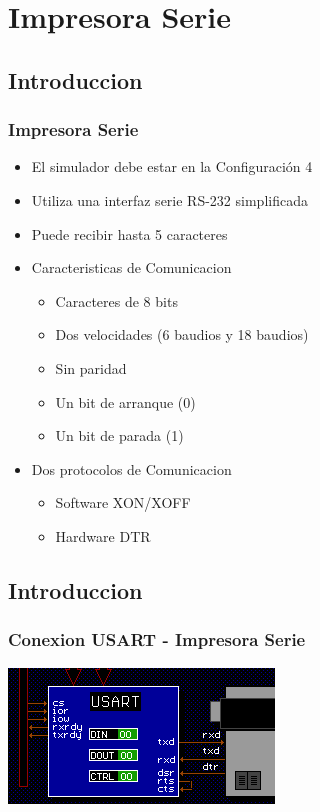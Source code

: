 \documentclass{beamer}
\begin{document}
\section{Impresora Serie}
\subsection{Introduccion}
\begin{frame}[fragile]
\frametitle{Impresora Serie}
\begin{itemize}
 \item El simulador debe estar en la Configuración 4
 \item Utiliza una interfaz serie RS-232 simplificada
 \item Puede recibir hasta 5 caracteres
 \item Caracteristicas de Comunicacion
 \begin{itemize}
  \item Caracteres de 8 bits
  \item Dos velocidades (6 baudios y 18 baudios)
  \item Sin paridad
  \item Un bit de arranque (0)
  \item Un bit de parada (1)
 \end{itemize}
  \item Dos protocolos de Comunicacion
\begin{itemize}
 \item Software XON/XOFF
 \item Hardware DTR
\end{itemize}

\end{itemize}
\end{frame}

\subsection{Introduccion}
\begin{frame}[fragile]
\frametitle{Conexion USART - Impresora Serie}
\begin{center}
 \includegraphics[scale=1.00]{conexion_usart.png}
\end{center}

\end{frame}
\end{document}
